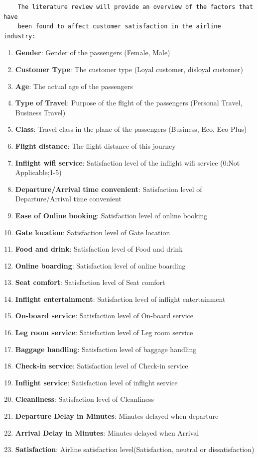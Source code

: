 \documentclass[11pt]{article}
\begin{document}
\begin{verbatim}
    The literature review will provide an overview of the factors that have 
    been found to affect customer satisfaction in the airline industry:
\end{verbatim}
\begin{enumerate}[label=\textbf{\arabic*.}]
  \item \textbf{Gender}: Gender of the passengers (Female, Male)
  \item \textbf{Customer Type}: The customer type (Loyal customer, disloyal customer)
  \item \textbf{Age}: The actual age of the passengers
  \item \textbf{Type of Travel}: Purpose of the flight of the passengers (Personal Travel, Business Travel)
  \item \textbf{Class}: Travel class in the plane of the passengers (Business, Eco, Eco Plus)
  \item \textbf{Flight distance}: The flight distance of this journey
  \item \textbf{Inflight wifi service}: Satisfaction level of the inflight wifi service (0:Not Applicable;1-5)
  \item \textbf{Departure/Arrival time convenient}: Satisfaction level of Departure/Arrival time convenient
  \item \textbf{Ease of Online booking}: Satisfaction level of online booking
  \item \textbf{Gate location}: Satisfaction level of Gate location
  \item \textbf{Food and drink}: Satisfaction level of Food and drink
  \item \textbf{Online boarding}: Satisfaction level of online boarding
  \item \textbf{Seat comfort}: Satisfaction level of Seat comfort
  \item \textbf{Inflight entertainment}: Satisfaction level of inflight entertainment
  \item \textbf{On-board service}: Satisfaction level of On-board service
  \item \textbf{Leg room service}: Satisfaction level of Leg room service
  \item \textbf{Baggage handling}: Satisfaction level of baggage handling
  \item \textbf{Check-in service}: Satisfaction level of Check-in service
  \item \textbf{Inflight service}: Satisfaction level of inflight service
  \item \textbf{Cleanliness}: Satisfaction level of Cleanliness
  \item \textbf{Departure Delay in Minutes}: Minutes delayed when departure
  \item \textbf{Arrival Delay in Minutes}: Minutes delayed when Arrival
  \item \textbf{Satisfaction}: Airline satisfaction level(Satisfaction, neutral or dissatisfaction)
\end{enumerate}
\end{document}
